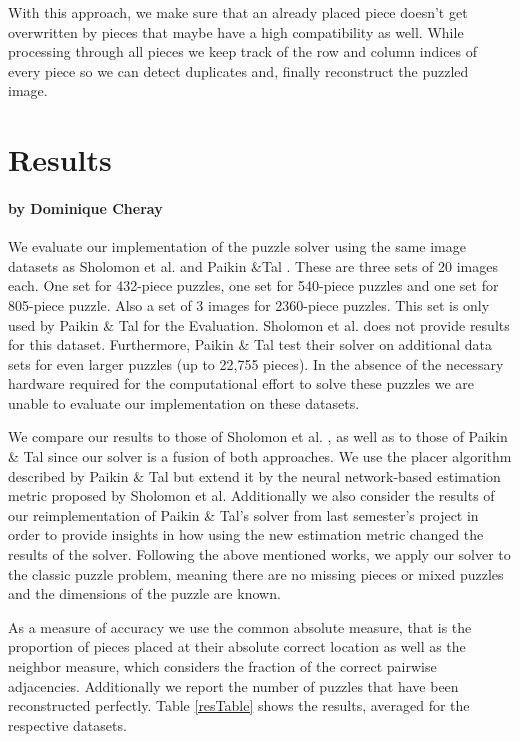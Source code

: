 \documentclass[11pt]{report}
\begin{document}
With this approach, we make sure that an already placed piece doesn't get overwritten by pieces that maybe have a high compatibility as well. While processing through all pieces we keep track of the row and column indices of every piece so we can detect duplicates and, finally reconstruct the puzzled image.


\chapter{Results}
\subsubsection*{by Dominique Cheray}

We evaluate our implementation of the puzzle solver using the same image
datasets as Sholomon et al. \cite{sholomon2016dnn} and Paikin \&Tal
\cite{Paikin2015}. These are three sets of 20 images each. One set for 432-piece
puzzles, one set for 540-piece puzzles and one set for 805-piece puzzle. Also a
set of 3 images for 2360-piece puzzles. This set is only used by Paikin \& Tal
for the Evaluation. Sholomon et al. does not provide results for this dataset.
Furthermore, Paikin \& Tal test their solver on additional data sets for even
larger puzzles (up to 22,755 pieces). In the absence of the necessary hardware
required for the computational effort to solve these puzzles we are unable to
evaluate our implementation on these datasets.

We compare our results to those of Sholomon et al. \cite{sholomon2016dnn}, as
well as to those of Paikin \& Tal \cite{Paikin2015} since our solver is a fusion
of both approaches. We use the placer algorithm described by Paikin \& Tal but
extend it by the neural network-based estimation metric proposed by Sholomon et
al. Additionally we also consider the results of our reimplementation of Paikin
\& Tal's solver from last semester's project in order to provide insights in how
using the new estimation metric changed the results of the solver. Following the
above mentioned works, we apply our
solver to the classic puzzle problem, meaning there are no missing pieces or
mixed puzzles and the dimensions of the puzzle are known.

As a measure of accuracy we use the common absolute measure, that is the
proportion of pieces placed at their absolute correct location as well as the
neighbor measure, which considers the fraction of the correct pairwise
adjacencies. Additionally we report the number of puzzles that have been
reconstructed perfectly. Table \ref{resTable} shows the results, averaged for
the respective datasets.
\end{document}
